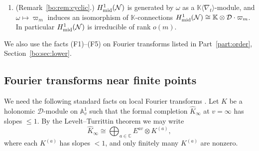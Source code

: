 \documentclass[11pt,a4paper]{article}
\theoremstyle{definition}
\theoremstyle{remark}
\numberwithin{equation}{section}
\newcommand{\C}{\mathbb{C}}
\newcommand{\Kt}{\mathbb{K}}
\newcommand{\A}{\mathbb{A}}
\newcommand{\cD}{\mathcal{D}}
\newcommand{\cN}{\mathcal{N}}
\begin{document}
\begin{enumerate}
\item[(P5)] (Remark~\ref{bo:rem:cyclic}.) $H^1_{\rm mid}(\cN)$ is generated by $\omega$ as a $\Kt\langle\nabla_t\rangle$-module, and $\omega\mapsto\varpi_m$ induces an isomorphism of $\Kt$-connections $H^1_{\rm mid}(\cN)\cong\Kt\otimes\cD\cdot\varpi_m$. In particular $H^1_{\rm mid}(\cN)$ is irreducible of rank $o(m)$.
\end{enumerate}
We also use the facts (F1)--(F5) on Fourier transforms listed in Part~\ref{part:order}, Section~\ref{bo:sec:lower}.

\subsection{Fourier transforms near finite points}\label{bs:sec:finite}
We need the following standard facts on local Fourier transforms \cite{BE04,GL04,Sab08,Ari08}. Let $K$ be a holonomic $\cD$-module on $\A^1_v$ such that the formal completion $\widehat K_\infty$ at $v=\infty$ has slopes $\le1$. By the Levelt--Turrittin theorem we may write
\[
\widehat K_\infty\cong\bigoplus_{a\in\C}E^{av}\otimes K^{(a)},
\]
where each $K^{(a)}$ has slopes $<1$, and only finitely many $K^{(a)}$ are nonzero.
\end{document}
